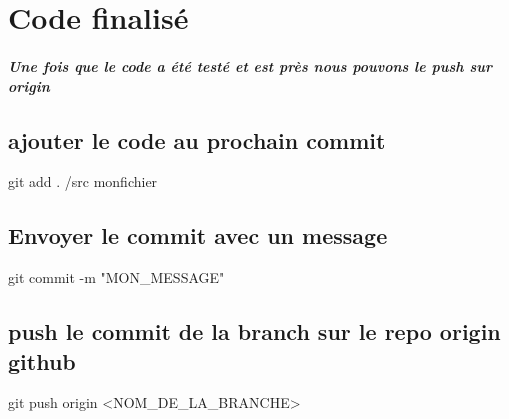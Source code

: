\documentclass{report}
\begin{document}
\chapter{Code finalisé}
\paragraph{Une fois que le code a été testé et est près nous pouvons le push sur origin}

\section{ajouter le code au prochain commit}
git add \og . /src monfichier \fg

\section{Envoyer le commit avec un message}
git commit -m "MON\_MESSAGE"

\section{push le commit de la branch sur le repo origin github}
git push origin <NOM\_DE\_LA\_BRANCHE>
\end{document}
